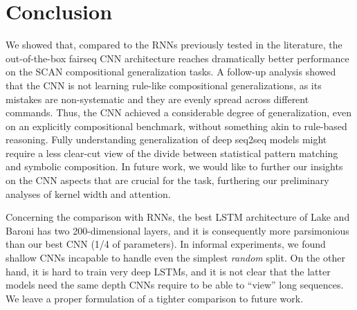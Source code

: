 \section{Conclusion}

We showed that, compared to the RNNs previously tested in the
literature, the out-of-the-box fairseq CNN architecture reaches
dramatically better performance on the SCAN compositional
generalization tasks. A follow-up analysis showed that the CNN
is not  learning rule-like compositional generalizations, as its
mistakes are non-systematic and they are evenly spread across different
commands. Thus, the CNN  achieved a considerable
degree of generalization, even on an explicitly compositional
benchmark, without something akin to rule-based reasoning. Fully
understanding generalization of deep seq2seq models might require a less
clear-cut view of the divide between statistical pattern matching and
symbolic composition. In future work, we would like to further our insights on the
CNN aspects that are crucial for the task, furthering our preliminary
analyses of kernel width and attention.

Concerning the comparison with RNNs, the best LSTM architecture of
Lake and Baroni has two 200-dimensional layers, and it is consequently
more parsimonious than our best CNN (1/4 of parameters). In informal
experiments, we found shallow CNNs incapable to handle even the
simplest \emph{random} split. On the other hand, it is hard to train
very deep LSTMs, and it is not clear that the latter models need the
same depth CNNs require to be able to ``view'' long sequences. We
leave a proper formulation of a tighter comparison to future work.
